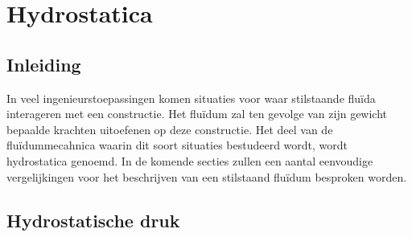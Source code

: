 \chapter{Hydrostatica}
\label{sec:Hydrostatica}

	\section{Inleiding}
	\label{sec:Hydrostatica Inleiding}
In veel ingenieurstoepassingen komen situaties voor waar stilstaande fluïda interageren met een constructie. Het fluïdum zal ten gevolge van zijn gewicht bepaalde krachten uitoefenen op deze constructie. Het deel van de fluïdummecahnica waarin dit soort situaties bestudeerd wordt, wordt hydrostatica genoemd. In de komende secties zullen een aantal eenvoudige vergelijkingen voor het beschrijven van een stilstaand fluïdum besproken worden.

	\section{Hydrostatische druk}
	\label{sec:Hydrostatische druk}
	
